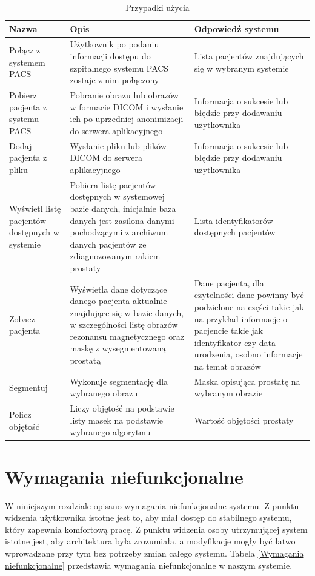 \documentclass[a4paper,11pt,twoside]{report}
\theoremstyle{definition}
\begin{document}
\begin{table}[h!]
\caption{Przypadki użycia}
\centering
\begin{tabular}{|p{3cm}|p{7cm}|p{6cm}|} \hline 
	Nazwa & Opis & Odpowiedź systemu \\ \hline 
	Połącz z systemem PACS & Użytkownik po podaniu informacji dostępu do szpitalnego systemu PACS zostaje z nim połączony & Lista pacjentów znajdujących się w wybranym systemie \\ \hline 
	Pobierz pacjenta z systemu PACS & Pobranie obrazu lub obrazów w formacie DICOM i wysłanie ich po uprzedniej anonimizacji do serwera aplikacyjnego & Informacja o sukcesie lub błędzie przy dodawaniu użytkownika \\ \hline 
	Dodaj pacjenta z pliku & Wysłanie pliku lub plików DICOM do serwera aplikacyjnego & Informacja o sukcesie lub błędzie przy dodawaniu użytkownika \\ \hline 
	Wyświetl listę pacjentów dostępnych w systemie & Pobiera listę pacjentów dostępnych w systemowej bazie danych, inicjalnie baza danych jest zasilona danymi pochodzącymi z archiwum danych pacjentów ze zdiagnozowanym rakiem prostaty & Lista identyfikatorów dostępnych pacjentów \\ \hline 
	Zobacz pacjenta & Wyświetla dane dotyczące danego pacjenta aktualnie znajdujące się w bazie danych, w szczególności listę obrazów rezonansu magnetycznego oraz maskę z wysegmentowaną prostatą & Dane pacjenta, dla czytelności dane powinny być podzielone na części takie jak na przykład informacje o pacjencie takie jak identyfikator czy data urodzenia, osobno informacje na temat obrazów  \\ \hline 
	Segmentuj & Wykonuje segmentację dla wybranego obrazu & Maska opisująca prostatę na wybranym obrazie \\ \hline 
	Policz objętość & Liczy objętość na podstawie listy masek na podstawie wybranego algorytmu & Wartość objętości prostaty\\ \hline 
\end{tabular}
\label{Przypadki użycia}
\end{table}

\section{Wymagania niefunkcjonalne}

W niniejszym rozdziale opisano wymagania niefunkcjonalne systemu. Z punktu widzenia użytkownika istotne jest to, aby miał dostęp do stabilnego systemu, który zapewnia komfortową pracę. Z punktu widzenia osoby utrzymującej system istotne jest, aby architektura była zrozumiała, a modyfikacje mogły być łatwo wprowadzane przy tym bez potrzeby zmian całego systemu. Tabela \ref{Wymagania niefunkcjonalne} przedstawia wymagania niefunkcjonalne w naszym systemie.
\end{document}
